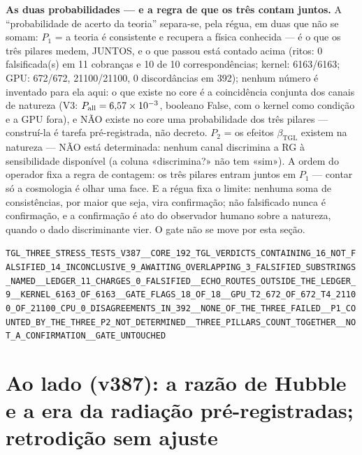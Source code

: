 \documentclass[11pt]{article}
\newcommand{\bTGL}{\beta_{\mathrm{TGL}}}\newcommand{\Msun}{M_{\odot}}\newcommand{\TGL}{\mathrm{TGL}}
\theoremstyle{definition}\newtheorem{deriv}{Derivação}
\begin{document}
\textbf{As duas probabilidades --- e a regra de que os três contam juntos.} A ``probabilidade de acerto da teoria'' separa-se, pela régua, em duas que não se somam: $P_1$ = a teoria é consistente e recupera a física conhecida --- é o que os três pilares medem, JUNTOS, e o que passou está contado acima (ritos: 0 falsificada(s) em 11 cobranças e 10 de 10 correspondências; kernel: 6163/6163; GPU: 672/672, 21100/21100, 0 discordâncias em 392); nenhum número é inventado para ela aqui: o que existe no core é a coincidência conjunta dos canais de natureza (V3: $P_{\rm all}=6{,}57\times10^{-3}$, booleano False, com o kernel como condição e a GPU fora), e NÃO existe no core uma probabilidade dos três pilares --- construí-la é tarefa pré-registrada, não decreto. $P_2$ = os efeitos $\bTGL$ existem na natureza --- NÃO está determinada: nenhum canal discrimina a RG à sensibilidade disponível (a coluna «discrimina?» não tem «sim»). A ordem do operador fixa a regra de contagem: os três pilares entram juntos em $P_1$ --- contar só a cosmologia é olhar uma face. E a régua fixa o limite: nenhuma soma de consistências, por maior que seja, vira confirmação; não falsificado nunca é confirmação, e a confirmação é ato do observador humano sobre a natureza, quando o dado discriminante vier. O gate não se move por esta seção.

\begin{center}\small\texttt{TGL\_THREE\_STRESS\_TESTS\_V387\_\_CORE\_192\_TGL\_VERDICTS\_CONTAINING\_16\_NOT\_FALSIFIED\_14\_INCONCLUSIVE\_9\_AWAITING\_OVERLAPPING\_3\_FALSIFIED\_SUBSTRINGS\_NAMED\_\_LEDGER\_11\_CHARGES\_0\_FALSIFIED\_\_ECHO\_ROUTES\_OUTSIDE\_THE\_LEDGER\_9\_\_KERNEL\_6163\_OF\_6163\_\_GATE\_FLAGS\_18\_OF\_18\_\_GPU\_T2\_672\_OF\_672\_T4\_21100\_OF\_21100\_CPU\_0\_DISAGREEMENTS\_IN\_392\_\_NONE\_OF\_THE\_THREE\_FAILED\_\_P1\_COUNTED\_BY\_THE\_THREE\_P2\_NOT\_DETERMINED\_\_THREE\_PILLARS\_COUNT\_TOGETHER\_\_NOT\_A\_CONFIRMATION\_\_GATE\_UNTOUCHED}\end{center}

\section*{Ao lado (v387): a razão de Hubble e a era da radiação pré-registradas; retrodição sem ajuste}

\end{document}
